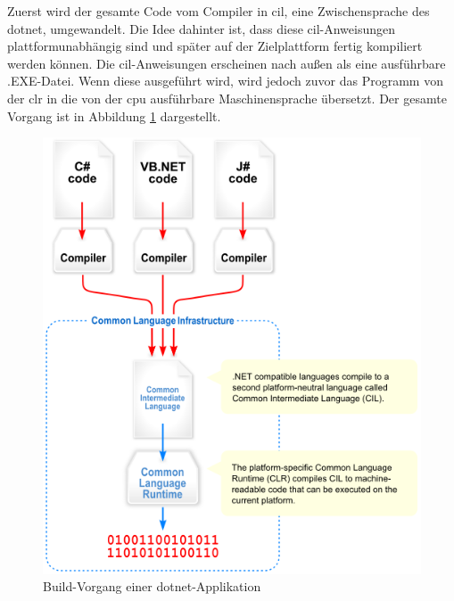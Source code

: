 Zuerst wird der gesamte Code vom Compiler in \ac{cil}, eine Zwischensprache des \ac{dotnet}, umgewandelt.
Die Idee dahinter ist, dass diese \ac{cil}-Anweisungen plattformunabhängig sind und später auf der Zielplattform fertig kompiliert werden können.
Die \ac{cil}-Anweisungen erscheinen nach außen als eine ausführbare .EXE-Datei.
Wenn diese ausgeführt wird, wird jedoch zuvor das Programm von der \ac{clr} in die von der \ac{cpu} ausführbare Maschinensprache übersetzt.
Der gesamte Vorgang ist in Abbildung \ref{fig:cs-compilation} dargestellt.
\begin{figure}[htbp!]
    \centering\includegraphics[width=.9\linewidth]{images/auswahl_rahmenwerk/dotnet-compilation.png}
    \caption{Build-Vorgang einer \ac{dotnet}-Applikation \cite{wiki-cli}}
    \label{fig:cs-compilation}
\end{figure}

